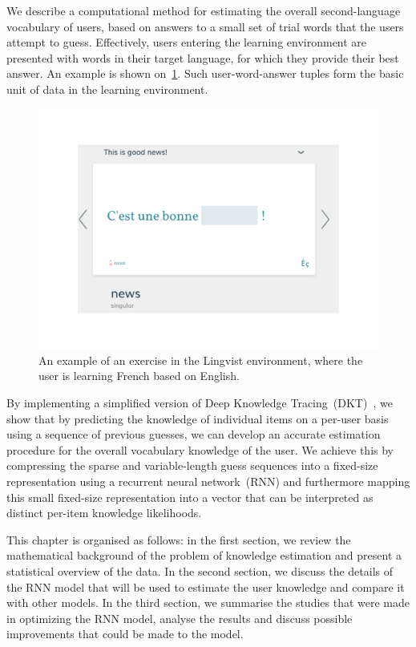 We describe a computational method for estimating the overall second-language vocabulary of users, based on answers to a small set of trial words that the users attempt to guess. Effectively, users entering the learning environment are presented with words in their target language, for which they provide their best answer. An example is shown on~\cref{fig:lu_example}. Such user-word-answer tuples form the basic unit of data in the learning environment.

\begin{figure}
\centering
\includegraphics[width=0.6\linewidth]{figures/lingvist/example_lu.pdf}
\caption[An example exercise in the Lingvist environment]{An example of an exercise in the Lingvist environment, where the user is learning French based on English.} 
\label{fig:lu_example} 
\end{figure} 

By implementing a simplified version of Deep Knowledge Tracing~(DKT)~\cite{DBLP:journals/corr/PiechSHGSGS15}, we show that by predicting the knowledge of individual items on a per-user basis using a sequence of previous guesses, we can develop an accurate estimation procedure for the overall vocabulary knowledge of the user. We achieve this by compressing the sparse and variable-length guess sequences into a fixed-size representation using a recurrent neural network~(RNN) and furthermore mapping this small fixed-size representation into a vector that can be interpreted as distinct per-item knowledge likelihoods.

This chapter is organised as follows: in the first section, we review the mathematical background of the problem of knowledge estimation and present a statistical overview of the data. In the second section, we discuss the details of the RNN model that will be used to estimate the user knowledge and compare it with other models. In the third section, we summarise the studies that were made in optimizing the RNN model, analyse the results and discuss possible improvements that could be made to the model.

